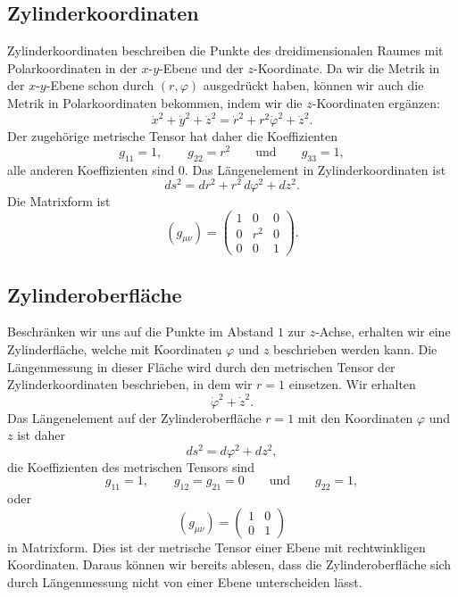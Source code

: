 \subsection{Zylinderkoordinaten}
Zylinderkoordinaten beschreiben die Punkte des dreidimensionalen
Raumes mit Polarkoordinaten in der $x$-$y$-Ebene und der $z$-Koordinate.
Da wir die Metrik in der $x$-$y$-Ebene schon durch $(r,\varphi)$
ausgedrückt haben, können wir auch die Metrik in Polarkoordinaten
bekommen, indem wir die $z$-Koordinaten ergänzen:
\[
\dot x^2+\dot y^2 +\dot z^2
=
\dot r^2 + r^2\dot\varphi^2 + \dot z^2.
\]
Der zugehörige metrische Tensor hat daher die Koeffizienten
\[
g_{11}=1,\qquad
g_{22}=r^2
\qquad\text{und}\qquad
g_{33}=1,
\]
alle anderen Koeffizienten sind $0$.
Das Längenelement in Zylinderkoordinaten ist
\[
ds^2
=
dr^2+r^2\,d\varphi^2 + dz^2.
\]
%
Die Matrixform ist
\[
(g_{\mu\nu})
=
\begin{pmatrix}
1&  0&0\\
0&r^2&0\\
0&  0&1
\end{pmatrix}.
\]

\subsection{Zylinderoberfläche}
Beschränken wir uns auf die Punkte im Abstand $1$ zur $z$-Achse, erhalten
wir eine Zylinderfläche, welche mit Koordinaten $\varphi$ und $z$
beschrieben werden kann.
Die Längenmessung in dieser Fläche wird durch den metrischen
Tensor der Zylinderkoordinaten beschrieben, in dem wir $r=1$ einsetzen.
Wir erhalten
\[
\dot\varphi^2+\dot z^2.
\]
Das Längenelement auf der Zylinderoberfläche $r=1$ mit den Koordinaten
$\varphi$ und $z$ ist daher
\[
ds^2
=
d\varphi^2+dz^2,
\]
%
die Koeffizienten des metrischen Tensors sind
\[
g_{11}=1,\qquad
g_{12}=g_{21}=0
\qquad\text{und}\qquad
g_{22}=1,
\]
oder
\[
(g_{\mu\nu})
=
\begin{pmatrix}
1&0\\0&1
\end{pmatrix}
\]
in Matrixform.
Dies ist der metrische Tensor einer Ebene mit rechtwinkligen Koordinaten.
Daraus können wir bereits ablesen, dass die Zylinderoberfläche sich durch
Längenmessung nicht von einer Ebene unterscheiden lässt.

